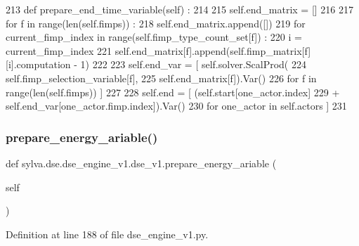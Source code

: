 \begin{DoxyCode}
213   \textcolor{keyword}{def }prepare\_end\_time\_variable(self) :
214 
215     self.end\_matrix = []
216 
217     \textcolor{keywordflow}{for} f \textcolor{keywordflow}{in} range(len(self.fimps)) :
218       self.end\_matrix.append([])
219       \textcolor{keywordflow}{for} current\_fimp\_index \textcolor{keywordflow}{in} range(self.fimp\_type\_count\_set[f]) :
220         i = current\_fimp\_index
221         self.end\_matrix[f].append(self.fimp\_matrix[f][i].computation - 1)
222 
223     self.end\_var = [ self.solver.ScalProd(
224                        self.fimp\_selection\_variable[f],
225                        self.end\_matrix[f]).Var()
226                      \textcolor{keywordflow}{for} f \textcolor{keywordflow}{in} range(len(self.fimps)) ]
227 
228     self.end = [ (self.start[one\_actor.index]
229                + self.end\_var[one\_actor.fimp.index]).Var()
230                  \textcolor{keywordflow}{for} one\_actor \textcolor{keywordflow}{in} self.actors ]
231 
\end{DoxyCode}
\mbox{\label{classsylva_1_1dse_1_1dse__engine__v1_1_1dse__v1_ac142dcc94d773d58c58ecda20a7394cf}} 
\subsubsection{\texorpdfstring{prepare\+\_\+energy\+\_\+ariable()}{prepare\_energy\_ariable()}}
{\footnotesize\ttfamily def sylva.\+dse.\+dse\+\_\+engine\+\_\+v1.\+dse\+\_\+v1.\+prepare\+\_\+energy\+\_\+ariable (\begin{DoxyParamCaption}\item[{}]{self }\end{DoxyParamCaption})}



Definition at line 188 of file dse\+\_\+engine\+\_\+v1.\+py.


